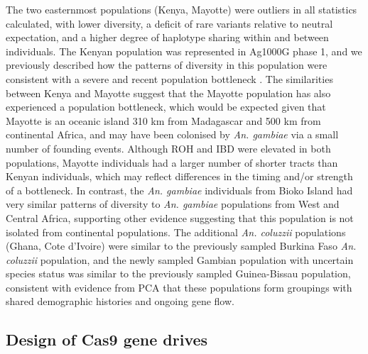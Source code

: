 \documentclass[a4paper,11pt,abstracton,hidelinks]{scrartcl}
\begin{document}
%
The two easternmost populations (Kenya, Mayotte) were outliers in all statistics calculated, with lower diversity, a deficit of rare variants relative to neutral expectation, and a higher degree of haplotype sharing within and between individuals.
%
The Kenyan population was represented in Ag1000G phase 1, and we previously described how the patterns of diversity in this population were consistent with a severe and recent population bottleneck \cite{Ag1000G2017}.
%
The similarities between Kenya and Mayotte suggest that the Mayotte population has also experienced a population bottleneck, which would be expected given that Mayotte is an oceanic island 310 km from Madagascar and 500 km from continental Africa, and may have been colonised by \textit{An. gambiae} via a small number of founding events.
%
Although ROH and IBD were elevated in both populations, Mayotte individuals had a larger number of shorter tracts than Kenyan individuals, which may reflect differences in the timing and/or strength of a bottleneck.
%
In contrast, the \textit{An. gambiae} individuals from Bioko Island had very similar patterns of diversity to \textit{An. gambiae} populations from West and Central Africa, supporting other evidence suggesting that this population is not isolated from continental populations.
%
The additional \textit{An. coluzzii} populations (Ghana, Cote d'Ivoire) were similar to the previously sampled Burkina Faso \textit{An. coluzzii} population, and the newly sampled Gambian population with uncertain species status was similar to the previously sampled Guinea-Bissau population, consistent with evidence from PCA that these populations form groupings with shared demographic histories and ongoing gene flow.


\subsection*{Design of Cas9 gene drives}
\end{document}

